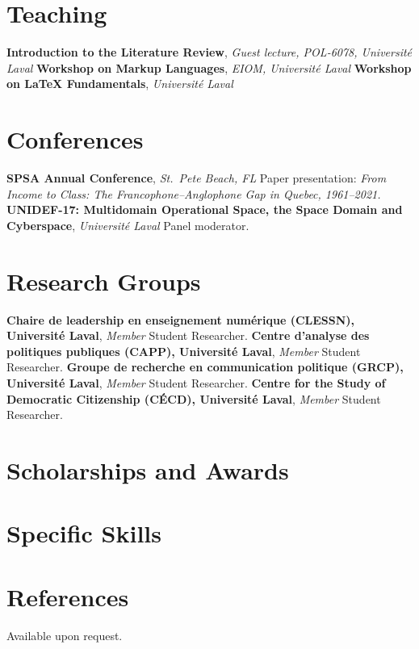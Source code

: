 \documentclass[10pt,letterpaper]{article}
\begin{document}
\section*{Teaching}
  {\textbf{Introduction to the Literature Review}, \textit{Guest lecture, POL-6078, Université Laval}}{}
  {\textbf{Workshop on Markup Languages}, \textit{EIOM, Université Laval}}{}
  {\textbf{Workshop on LaTeX Fundamentals}, \textit{Université Laval}}{}

\section*{Conferences}
  {\textbf{SPSA Annual Conference}, \textit{St.\ Pete Beach, FL}}
  {Paper presentation: \textit{From Income to Class: The Francophone--Anglophone Gap in Quebec, 1961--2021.}}
  {\textbf{UNIDEF-17: Multidomain Operational Space, the Space Domain and Cyberspace}, \textit{Université Laval}}
  {Panel moderator.}

\section*{Research Groups}
  {\textbf{Chaire de leadership en enseignement numérique (CLESSN), Université Laval}, \textit{Member}}
  {Student Researcher.}
  {\textbf{Centre d'analyse des politiques publiques (CAPP), Université Laval}, \textit{Member}}
  {Student Researcher.}
  {\textbf{Groupe de recherche en communication politique (GRCP), Université Laval}, \textit{Member}}
  {Student Researcher.}
  {\textbf{Centre for the Study of Democratic Citizenship (CÉCD), Université Laval}, \textit{Member}}
  {Student Researcher.}

\section*{Scholarships and Awards}

\section*{Specific Skills}

\section*{References}
Available upon request.
\end{document}
